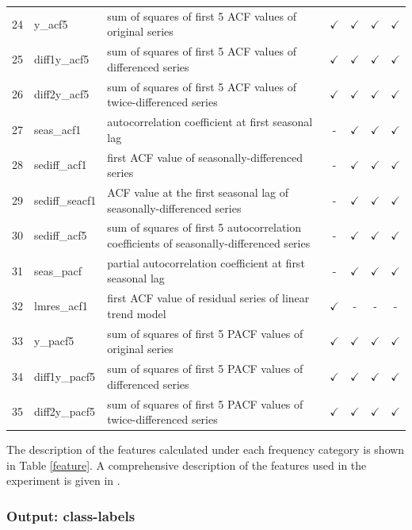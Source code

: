 \documentclass[11pt,a4paper,]{article}
\def\yes{$\checkmark$}
\begin{document}
\begin{table}[!htp]
\begin{tabular}{llp{}cccc}
24 & y\_acf5        & sum of squares of first 5 ACF values of original series                                 & \yes  & \yes & \yes & \yes\\
25 & diff1y\_acf5   & sum of squares of first 5 ACF values of differenced series                              & \yes  & \yes & \yes & \yes\\
26 & diff2y\_acf5   & sum of squares of first 5 ACF values of twice-differenced series                        & \yes  & \yes & \yes & \yes \\
27 & seas\_acf1     & autocorrelation coefficient at first seasonal lag                                       & -     & \yes & \yes & \yes\\
28 & sediff\_acf1   & first ACF value of seasonally-differenced series                                        & -     & \yes & \yes & \yes\\
29 & sediff\_seacf1 & ACF value at the first seasonal lag of seasonally-differenced series                    & -     & \yes & \yes & \yes\\
30 & sediff\_acf5   & sum of squares of first 5 autocorrelation coefficients of seasonally-differenced series & -     & \yes & \yes & \yes\\
31 & seas\_pacf     & partial autocorrelation coefficient at first seasonal lag & -     & \yes & \yes & \yes\\
32 & lmres\_acf1    & first ACF value of residual series of linear trend model                                & \yes  & - & - & -\\
33 & y\_pacf5       & sum of squares of first 5 PACF values of original series                                & \yes  & \yes & \yes & \yes\\
34 & diff1y\_pacf5  & sum of squares of first 5 PACF values of differenced series                             & \yes  & \yes & \yes & \yes\\
35 & diff2y\_pacf5  & sum of squares of first 5 PACF values of twice-differenced series                       & \yes  & \yes & \yes & \yes\\
\bottomrule
 \end{tabular}
\end{table}

The description of the features calculated under each frequency category
is shown in Table \ref{feature}. A comprehensive description of the
features used in the experiment is given in \textcite{fforms}.

\subsubsection{Output: class-labels}\label{output-class-labels}
\end{document}
